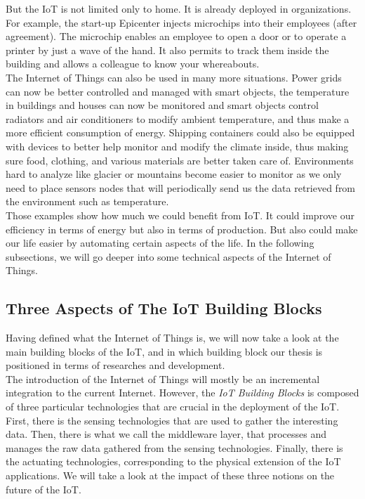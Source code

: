 But the IoT is not limited only to home. It is already deployed in organizations. For example, the start-up Epicenter injects microchips into their employees (after agreement)\cite{website:lat_04_17}. The microchip enables an employee to open a door or to operate a printer by just a wave of the hand. It also permits to track them inside the building and allows a colleague to know your whereabouts. \\

The Internet of Things can also be used in many more situations. Power grids can now be better controlled and managed with smart objects, the temperature in buildings and houses can now be monitored and smart objects control radiators and air conditioners to modify ambient temperature, and thus make a more efficient consumption of energy. Shipping containers could also be equipped with devices to better help monitor and modify the climate inside, thus making sure food, clothing, and various materials are better taken care of. Environments hard to analyze like glacier or mountains become easier to monitor as we only need to place sensors nodes that will periodically send us the data retrieved from the environment such as temperature. \\

Those examples show how much we could benefit from IoT. It could improve our efficiency in terms of energy but also in terms of production. But also could make our life easier by automating certain aspects of the life. In the following subsections, we will go deeper into some technical aspects of the Internet of Things. \\

\subsection*{Three Aspects of The IoT Building Blocks}

Having defined what the Internet of Things is, we will now take a look at the main building blocks of the IoT, and in which building block our thesis is positioned in terms of researches and development. \\

The introduction of the Internet of Things will mostly be an incremental integration to the current Internet. However, the \textit{IoT Building Blocks} is composed of three particular technologies that are crucial in the deployment of the IoT. First, there is the sensing technologies that are used to gather the interesting data. Then, there is what we call the middleware layer, that processes and manages the raw data gathered from the sensing technologies. Finally, there is the actuating technologies, corresponding to the physical extension of the IoT applications. We will take a look at the impact of these three notions on the future of the IoT.\\

